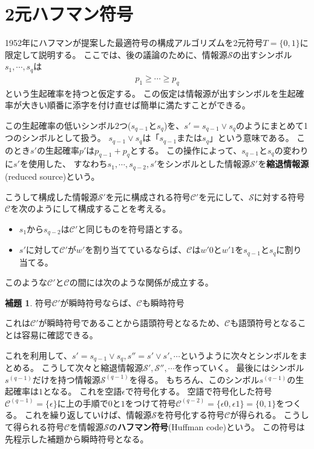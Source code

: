 \documentclass[pdflatex, ja=standard, a4paper]{bxjsarticle}
\theoremstyle{definition}
\newtheorem{lemma}{補題}
\begin{document}
\section{2元ハフマン符号}
1952年にハフマンが提案した最適符号の構成アルゴリズム\cite{huffman-52}を2元符号$T = \{0, 1\}$に限定して説明する。
\newcommand{\source}{\mathcal{S}}
ここでは、後の議論のために、情報源$\source$の出すシンボル$s_1, \cdots, s_q$は
\begin{align*}
    p_1 \geq \cdots \geq p_q
\end{align*}
という生起確率を持つと仮定する。
この仮定は情報源が出すシンボルを生起確率が大きい順番に添字を付け直せば簡単に満たすことができる。

この生起確率の低いシンボル2つ($s_{q - 1}$と$s_q$)を、$s' = s_{q - 1} \lor s_q$のようにまとめて1つのシンボルとして扱う。
$s_{q - 1} \lor s_q$は「$s_{q - 1}$または$s_q$」という意味である。
このとき$s'$の生起確率$p'$は$p_{q - 1} + p_q$とする。
この操作によって、$s_{q - 1}$と$s_q$の変わりに$s'$を使用した、
すなわち$s_1, \cdots, s_{q - 2}, s'$をシンボルとした情報源$\source'$を\textbf{縮退情報源}(reduced source)という。

\newcommand{\code}{\mathcal{C}}
こうして構成した情報源$\source'$を元に構成される符号$\code'$を元にして、$\source$に対する符号$\code$を次のようにして構成することを考える。
\begin{itemize}
    \item $s_1$から$s_{q - 2}$は$\code'$と同じものを符号語とする。
    \item $s'$に対して$\code'$が$w'$を割り当てているならば、$\code$は$w'0$と$w'1$を$s_{q - 1}$と$s_q$に割り当てる。
\end{itemize}
このような$\code'$と$\code$の間には次のような関係が成立する。
\begin{lemma} \label{lem:lem1}
    符号$\code'$が瞬時符号ならば、$\code$も瞬時符号
\end{lemma}
これは$\code'$が瞬時符号であることから語頭符号となるため、$\code$も語頭符号となることは容易に確認できる。

これを利用して、$s' = s_{q - 1} \lor s_q, s'' = s' \lor s', \cdots$というように次々とシンボルをまとめる。
こうして次々と縮退情報源$\source', \source'', \cdots$を作っていく。
最後にはシンボル$s^{(q - 1)}$だけを持つ情報源$\source^{(q - 1)}$を得る。
もちろん、このシンボル$s^{(q - 1)}$の生起確率は$1$となる。
これを空語$\epsilon$で符号化する。
空語で符号化した符号$\code^{(q - 1)} = \{\epsilon\}$に上の手順で$0$と$1$をつけて符号$\code^{(q - 2)} = \{\epsilon 0, \epsilon 1\} = \{0, 1\}$をつくる。
これを繰り返していけば、情報源$\source$を符号化する符号$\code$が得られる。
こうして得られる符号$\code$を情報源$\source$の\textbf{ハフマン符号}(Huffman code)という。
この符号は先程示した補題から瞬時符号となる。
\end{document}
